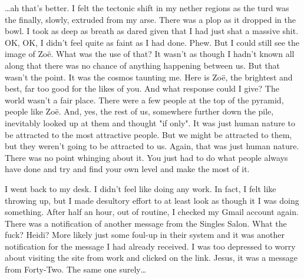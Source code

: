 {\dots}ah that's better. I felt the tectonic shift in my nether
regions as the turd was the finally, slowly, extruded from my arse.
There was a plop as it dropped in the bowl. I took as deep as breath
as dared given that I had just shat a massive shit. OK, OK, I didn't
feel quite as faint as I had done. Phew. But I could still see the
image of Zo{\"e}. What was the use of that? It wasn't as though I
hadn't known all along that there was no chance of anything
happening between us. But that wasn't the point. It was the cosmos
taunting me. Here is Zo{\"e}, the brightest and best, far too good
for the likes of {\twelveit you}. And what response could I give?
The world wasn't a fair place. There were a few people at the top of
the pyramid, people like Zo{\"e}. And, yes, the rest of us,
somewhere further down the pile, inevitably looked up at them and
thought "if only". It was just human nature to be attracted to the
most attractive people. But we might be attracted to them, but they
weren't going to be attracted to us. Again, that was just human
nature. There was no point whinging about it. You just had to do
what people always have done and try and find your own level and
make the most of it.

I went back to my desk. I didn't feel like doing any work. In fact,
I felt like throwing up, but I made desultory effort to at least
look as though it I was doing something. After half an hour, out of
routine, I checked my Gmail account again. There was a notification
of another message from the Singles Salon. What the fuck? Heidi?
More likely just some foul-up in their system and it was another
notification for the message I had already received. I was too
depressed to worry about visiting the site from work and clicked on
the link. Jesus, it was a message from Forty-Two. The same one
surely\dots

